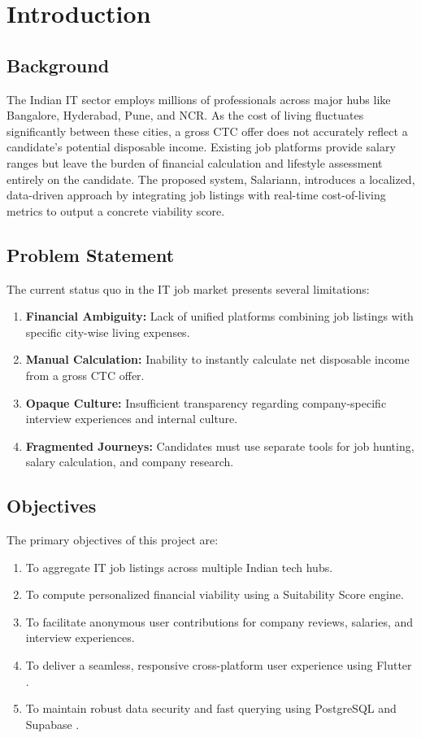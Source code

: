 \chapter{Introduction}

\section{Background}
The Indian IT sector employs millions of professionals across major hubs like Bangalore, Hyderabad, Pune, and NCR. As the cost of living fluctuates significantly between these cities, a gross CTC offer does not accurately reflect a candidate's potential disposable income. Existing job platforms \cite{salary_est} provide salary ranges but leave the burden of financial calculation and lifestyle assessment entirely on the candidate. The proposed system, Salariann, introduces a localized, data-driven approach by integrating job listings with real-time cost-of-living metrics to output a concrete viability score.

\section{Problem Statement}
The current status quo in the IT job market presents several limitations:
\begin{enumerate}
    \item \textbf{Financial Ambiguity:} Lack of unified platforms combining job listings with specific city-wise living expenses.
    \item \textbf{Manual Calculation:} Inability to instantly calculate net disposable income from a gross CTC offer.
    \item \textbf{Opaque Culture:} Insufficient transparency regarding company-specific interview experiences and internal culture.
    \item \textbf{Fragmented Journeys:} Candidates must use separate tools for job hunting, salary calculation, and company research.
\end{enumerate}

\section{Objectives}
The primary objectives of this project are:
\begin{enumerate}
    \item To aggregate IT job listings across multiple Indian tech hubs.
    \item To compute personalized financial viability using a Suitability Score engine.
    \item To facilitate anonymous user contributions for company reviews, salaries, and interview experiences.
    \item To deliver a seamless, responsive cross-platform user experience using Flutter \cite{flutter}.
    \item To maintain robust data security and fast querying using PostgreSQL and Supabase \cite{supabase}.
\end{enumerate}

